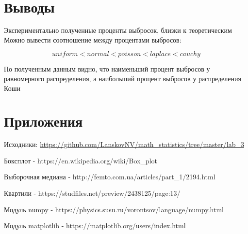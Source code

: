 \documentclass[12pt]{article}
\begin{document}
\section{Выводы}
\par Экспериментально полученные проценты выбросок, близки к теоретическим
Можно вывести соотношение между процентами выбросов:

\begin{equation}
uniform<normal<poisson<laplace<cauchy
\end{equation}

\par По полученным данным видно, что наименьший процент выбросов у равномерного распределения, а наибольший процент выбросов у распределения Коши

\section{Приложения}

Исходники: \url{https://github.com/LanskovNV/math_statistics/tree/master/lab_3}

\begin{thebibliography}{}
    Боксплот - https://en.wikipedia.org/wiki/Box\_plot

    Выборочная медиана  -  http://femto.com.ua/articles/part\_1/2194.html
    
    Квартили -  https://studfiles.net/preview/2438125/page:13/
    
    Модуль numpy  -  https://physics.susu.ru/vorontsov/language/numpy.html
    
    Модуль matplotlib - https://matplotlib.org/users/index.html
    
 
\end{thebibliography}
\end{document}
